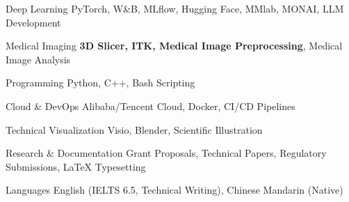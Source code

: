 

\begin{cvskills}

  \cvskill
  {Deep Learning}
  {PyTorch, W\&B, MLflow, Hugging Face, MMlab, MONAI, LLM Development}

  \cvskill
  {Medical Imaging}
  {\textbf{3D Slicer, ITK, Medical Image Preprocessing}, Medical Image Analysis}

  \cvskill
  {Programming}
  {Python, C++, Bash Scripting}

  \cvskill
  {Cloud \& DevOps}
  {Alibaba/Tencent Cloud, Docker, CI/CD Pipelines}

  \cvskill
  {Technical Visualization}
  {Visio, Blender, Scientific Illustration}

  \cvskill
  {Research \& Documentation}
  {Grant Proposals, Technical Papers, Regulatory Submissions, LaTeX Typesetting}

  \cvskill
  {Languages}
  {English (IELTS 6.5, Technical Writing), Chinese Mandarin (Native)}

\end{cvskills}
